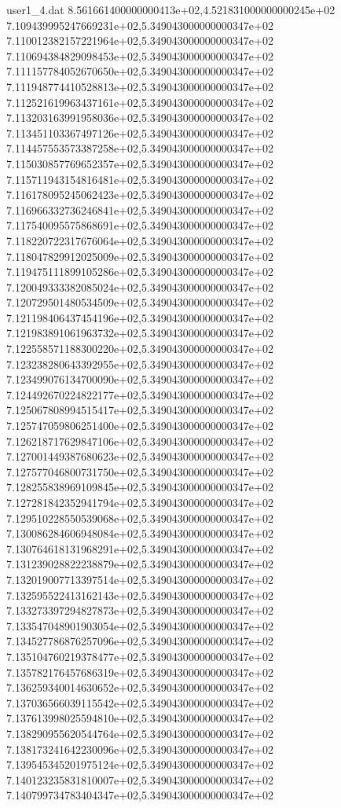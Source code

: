 \begin{filecontents}{user1_4.dat}
8.561661400000000413e+02,4.521831000000000245e+02
7.109439995247669231e+02,5.349043000000000347e+02
7.110012382157221964e+02,5.349043000000000347e+02
7.110694384829098453e+02,5.349043000000000347e+02
7.111157784052670650e+02,5.349043000000000347e+02
7.111948774410528813e+02,5.349043000000000347e+02
7.112521619963437161e+02,5.349043000000000347e+02
7.113203163991958036e+02,5.349043000000000347e+02
7.113451103367497126e+02,5.349043000000000347e+02
7.114457553573387258e+02,5.349043000000000347e+02
7.115030857769652357e+02,5.349043000000000347e+02
7.115711943154816481e+02,5.349043000000000347e+02
7.116178095245062423e+02,5.349043000000000347e+02
7.116966332736246841e+02,5.349043000000000347e+02
7.117540095575868691e+02,5.349043000000000347e+02
7.118220722317676064e+02,5.349043000000000347e+02
7.118047829912025009e+02,5.349043000000000347e+02
7.119475111899105286e+02,5.349043000000000347e+02
7.120049333382085024e+02,5.349043000000000347e+02
7.120729501480534509e+02,5.349043000000000347e+02
7.121198406437454196e+02,5.349043000000000347e+02
7.121983891061963732e+02,5.349043000000000347e+02
7.122558571188300220e+02,5.349043000000000347e+02
7.123238280643392955e+02,5.349043000000000347e+02
7.123499076134700090e+02,5.349043000000000347e+02
7.124492670224822177e+02,5.349043000000000347e+02
7.125067808994515417e+02,5.349043000000000347e+02
7.125747059806251400e+02,5.349043000000000347e+02
7.126218717629847106e+02,5.349043000000000347e+02
7.127001449387680623e+02,5.349043000000000347e+02
7.127577046800731750e+02,5.349043000000000347e+02
7.128255838969109845e+02,5.349043000000000347e+02
7.127281842352941794e+02,5.349043000000000347e+02
7.129510228550539068e+02,5.349043000000000347e+02
7.130086284606948084e+02,5.349043000000000347e+02
7.130764618131968291e+02,5.349043000000000347e+02
7.131239028822238879e+02,5.349043000000000347e+02
7.132019007713397514e+02,5.349043000000000347e+02
7.132595522413162143e+02,5.349043000000000347e+02
7.133273397294827873e+02,5.349043000000000347e+02
7.133547048901903054e+02,5.349043000000000347e+02
7.134527786876257096e+02,5.349043000000000347e+02
7.135104760219378477e+02,5.349043000000000347e+02
7.135782176457686319e+02,5.349043000000000347e+02
7.136259340014630652e+02,5.349043000000000347e+02
7.137036566039115542e+02,5.349043000000000347e+02
7.137613998025594810e+02,5.349043000000000347e+02
7.138290955620544764e+02,5.349043000000000347e+02
7.138173241642230096e+02,5.349043000000000347e+02
7.139545345201975124e+02,5.349043000000000347e+02
7.140123235831810007e+02,5.349043000000000347e+02
7.140799734783404347e+02,5.349043000000000347e+02

\end{filecontents}
